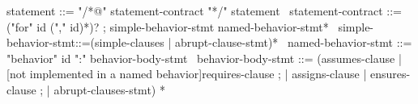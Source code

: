 \begin{syntax}
  statement ::= "/*@" statement-contract "*/" statement
  \
  statement-contract ::= {("for" id ("," id)*)?} ;
    simple-behavior-stmt named-behavior-stmt*
  \
  simple-behavior-stmt::=(simple-clauses | {abrupt-clause-stmt})*
  \
  named-behavior-stmt ::= "behavior" id ":" behavior-body-stmt
  \
  behavior-body-stmt ::= (assumes-clause |
                     {[not implemented in a named behavior]requires-clause} ;
                    | assigns-clause | ensures-clause ;
                    | {abrupt-clauses-stmt}) *
\end{syntax}
